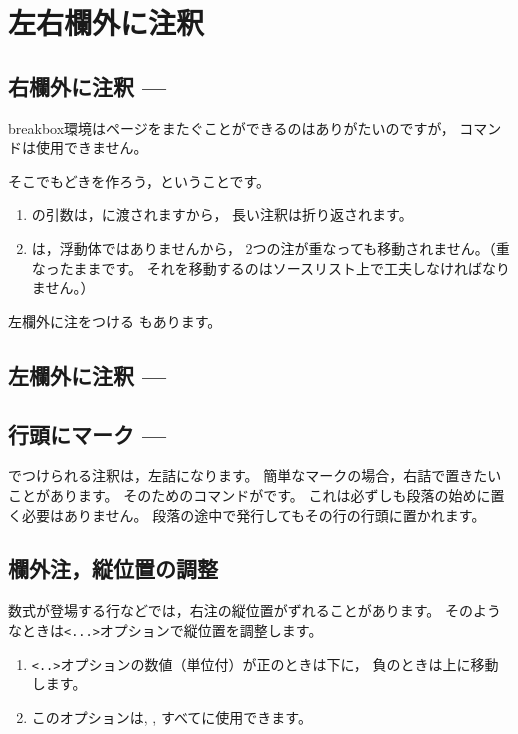 \documentclass[a4j,fleqn]{jarticle}
\begin{document}
\section{左右欄外に注釈}
\subsection{右欄外に注釈 --- }
\textsf{breakbox}環境はページをまたぐことができるのはありがたいのですが，
コマンドは使用できません。

そこでもどきを作ろう，ということです。\bigskip

\begin{enumerate}[注 1)]
  \item {}の引数は，に渡されますから，
    長い注釈は折り返されます。
  \item {}は，浮動体ではありませんから，
    2つの注が重なっても移動されません。（重なったままです。
    それを移動するのはソースリスト上で工夫しなければなりません。）
\end{enumerate}


左欄外に注をつける もあります。

\subsection{左欄外に注釈 --- }



\subsection{行頭にマーク --- }
でつけられる注釈は，左詰になります。
簡単なマークの場合，右詰で置きたいことがあります。
そのためのコマンドがです。
これは必ずしも段落の始めに置く必要はありません。
段落の途中で発行してもその行の行頭に置かれます。



\subsection{欄外注，縦位置の調整}
数式が登場する行などでは，右注の縦位置がずれることがあります。
そのようなときは\verb+<...>+オプションで縦位置を調整します。
\bigskip



\begin{enumerate}[注1)~]
  \item \verb+<..>+オプションの数値（単位付）が正のときは下に，
    負のときは上に移動します。
  \item このオプションは, , 
    すべてに使用できます。
\end{enumerate}
\end{document}
